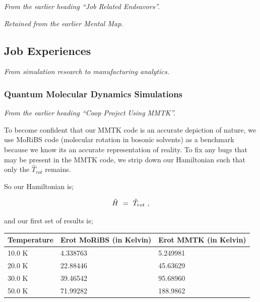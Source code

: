 \documentclass{article}
\newcounter{subsubsubsection}[subsubsection]
\begin{document}
\textit{From the earlier heading ``Job Related Endeavors''.}

\textit{Retained from the earlier Mental Map.}

\subsection{Job Experiences}\label{sec:job-experiences}
\textit{From simulation research to manufacturing analytics.}

\newpage 

\subsubsection{Quantum Molecular Dynamics Simulations}\label{sec:quantum-molecular-dynamics-simulations}

\textit{From the earlier heading ``Coop Project Using MMTK''.}

To become confident that our MMTK code is an accurate depiction of nature, we use MoRiBS code (molecular rotation in bosonic solvents) as a benchmark because we know its an accurate representation of reality. To fix any bugs that may be present in the MMTK code, we strip down our Hamiltonian such that only the \begin{math} \hat{T}_{rot} \end{math} remains. 

So our Hamiltonian is;

\begin{equation} \label{eb-eq-3-2}
\hat{H} \hspace{0.125cm} = \hspace{0.125cm} \hat{T}_{rot} \hspace{0.125cm} ,
\end{equation}

and our first set of results is; \\

\begin{center}
\begin{tabular*}{\textwidth}{ | p{} | p{}| p{}|}
\hline
\textbf{Temperature} & \textbf{Erot MoRiBS} (in Kelvin) & \textbf{Erot MMTK} (in Kelvin) \\ 
\hline 
10.0 K & 4.338763 & 5.249981 \\ 
\hline
20.0 K & 22.88446 & 45.63629 \\
\hline 
30.0 K & 39.46542 & 95.68960 \\ 
\hline 
50.0 K & 71.99282 & 188.9862 \\
\hline 
\end{tabular*}
\end{center} 
\end{document}
